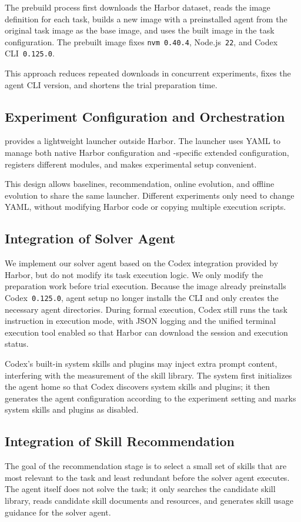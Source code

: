 The prebuild process first downloads the Harbor dataset, reads the image definition for each task, builds a new image with a preinstalled agent from the original task image as the base image, and uses the built image in the task configuration. The prebuilt image fixes \texttt{nvm}~\texttt{0.40.4}, Node.js~\texttt{22}, and Codex CLI~\texttt{0.125.0}.

This approach reduces repeated downloads in concurrent experiments, fixes the agent CLI version, and shortens the trial preparation time.

\subsection{Experiment Configuration and Orchestration}
\ours provides a lightweight launcher outside Harbor. The launcher uses YAML to manage both native Harbor configuration and \ours-specific extended configuration, registers different modules, and makes experimental setup convenient.

This design allows baselines, recommendation, online evolution, and offline evolution to share the same launcher. Different experiments only need to change YAML, without modifying Harbor code or copying multiple execution scripts.

\subsection{Integration of Solver Agent}
We implement our solver agent based on the Codex integration provided by Harbor, but do not modify its task execution logic. We only modify the preparation work before trial execution. Because the image already preinstalls Codex~\texttt{0.125.0}, agent setup no longer installs the CLI and only creates the necessary agent directories. During formal execution, Codex still runs the task instruction in execution mode, with JSON logging and the unified terminal execution tool enabled so that Harbor can download the session and execution status.

Codex's built-in system skills and plugins may inject extra prompt content, interfering with the measurement of the \ours skill library. The system first initializes the agent home so that Codex discovers system skills and plugins; it then generates the agent configuration according to the experiment setting and marks system skills and plugins as disabled.

\subsection{Integration of Skill Recommendation}
The goal of the recommendation stage is to select a small set of skills that are most relevant to the task and least redundant before the solver agent executes. The agent itself does not solve the task; it only searches the candidate skill library, reads candidate skill documents and resources, and generates skill usage guidance for the solver agent.

